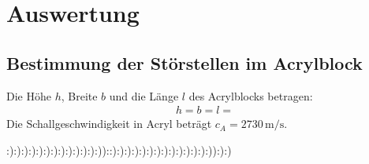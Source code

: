 \section{Auswertung}
\label{sec:Auswertung}

\subsection{Bestimmung der Störstellen im Acrylblock}

Die Höhe $h$, Breite $b$ und die Länge $l$ des Acrylblocks betragen:
\begin{align*}
h = 
b = 
l =
\end{align*}
Die Schallgeschwindigkeit in Acryl beträgt $c_A=2730 \, \si{\meter\per\second} $.

:):):):):):):):):):):):):))::):):):):):):):):):):):):):)):):)

